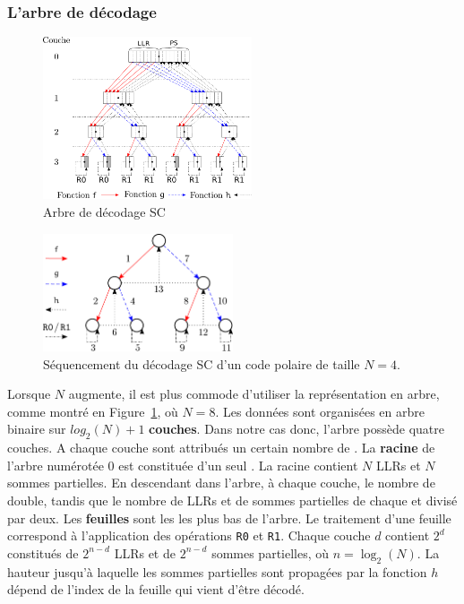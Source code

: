 \subsubsection{L'arbre de décodage}
\begin{figure}[t]
\centering
\includegraphics[width=0.55\textwidth]{main/ch1_fig/sc}
\caption{Arbre de décodage SC}
\label{fig:sc}
\end{figure}
\begin{figure}[t]
\centering
\includegraphics[width=0.5\textwidth]{main/ch1_fig/seq_sc}
\caption{Séquencement du décodage SC d'un code polaire de taille $N=4$.}
\label{fig:seq_sc}
\end{figure}
Lorsque $N$ augmente, il est plus commode d'utiliser la représentation en arbre, comme montré en Figure~\ref{fig:sc}, où $N=8$.
Les données sont organisées en arbre binaire sur $log_2(N) + 1$ \textbf{couches}. Dans notre cas donc, l'arbre possède quatre couches.
A chaque couche sont attribués un certain nombre de \textbf{\noeuds}.
La \textbf{racine} de l'arbre numérotée $0$ est constituée d'un seul \noeud.
La racine contient $N$ LLRs et $N$ sommes partielles.
En descendant dans l'arbre, à chaque couche, le nombre de \noeuds double, tandis que le nombre de LLRs et de sommes partielles de chaque \noeud et divisé par deux.
Les \textbf{feuilles} sont les \noeuds les plus bas de l'arbre.
Le traitement d'une feuille correspond à l'application des opérations \texttt{R0} et \texttt{R1}.
Chaque couche $d$ contient $2^d$ \noeuds constitués de $2^{n-d}$ LLRs et de $2^{n-d}$ sommes partielles, où $n=\log_2(N)$. 
La hauteur jusqu'à laquelle les sommes partielles sont propagées par la fonction $h$ dépend de l'index de la feuille qui vient d'être décodé.

